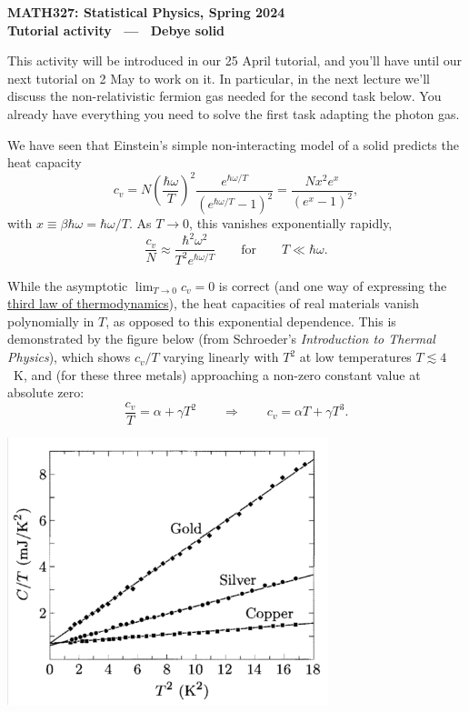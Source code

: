 \documentclass[12 pt]{article} %
\newcommand{\al}{\ensuremath{\alpha} }
\newcommand{\be}{\ensuremath{\beta} }
\newcommand{\ga}{\ensuremath{\gamma} }
\newcommand{\om}{\ensuremath{\omega} }
\newcommand{\Lra}{\ensuremath{\Longrightarrow} }
\begin{document}
\newcommand{\thisunit}{MATH327 Tutorial (Debye)}
\newcommand{\moddate}{Last modified 25 Apr.~2024}
\begin{center}
  {\Large \textbf{MATH327: Statistical Physics, Spring 2024}} \\[12 pt]
  {\Large \textbf{Tutorial activity \ --- \ Debye solid}} \\[24 pt]
\end{center}

This activity will be introduced in our 25 April tutorial, and you'll have until our next tutorial on 2 May to work on it.
In particular, in the next lecture we'll discuss the non-relativistic fermion gas needed for the second task below.
You already have everything you need to solve the first task adapting the photon gas.

We have seen that Einstein's simple non-interacting model of a solid predicts the heat capacity
\begin{equation*}
  c_v = N \left(\frac{\hbar \om}{T}\right)^2 \frac{e^{\hbar \om / T}}{\left(e^{\hbar \om / T} - 1\right)^2} = \frac{N x^2 e^x}{\left(e^x - 1\right)^2},
\end{equation*}
with $x \equiv \be\hbar\om = \hbar\om / T$.
As $T \to 0$, this vanishes exponentially rapidly,
\begin{equation*}
  \frac{c_v}{N} \approx \frac{\hbar^2 \om^2}{T^2 e^{\hbar \om / T}} \qquad \mbox{for} \qquad T \ll \hbar\om.
\end{equation*}

While the asymptotic $\lim_{T \to 0} c_v = 0$ is correct (and one way of expressing the \href{https://en.wikipedia.org/wiki/Third_law_of_thermodynamics#Specific_heat}{third law of thermodynamics}), the heat capacities of real materials vanish polynomially in $T$, as opposed to this exponential dependence.
This is demonstrated by the figure below (from Schroeder's \textit{Introduction to Thermal Physics}), which shows $c_v / T$ varying linearly with $T^2$ at low temperatures $T \lesssim 4$~K, and (for these three metals) approaching a non-zero constant value at absolute zero:
\begin{equation*}
  \frac{c_v}{T} = \al + \ga T^2 \qquad \Lra \qquad c_v = \al T + \ga T^3.
\end{equation*}

\begin{center}\includegraphics[width=0.7\textwidth]{figs/heat_cap-lowT.pdf}\end{center}
\end{document}
